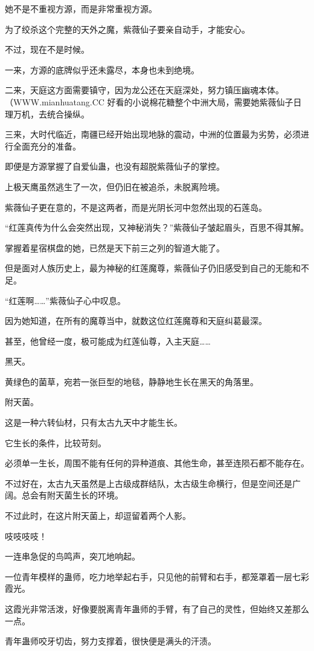 \begin{this_body}
她不是不重视方源，而是非常重视方源。

为了绞杀这个完整的天外之魔，紫薇仙子要亲自动手，才能安心。

不过，现在不是时候。

一来，方源的底牌似乎还未露尽，本身也未到绝境。

二来，天庭这方面需要镇守，因为龙公还在天庭深处，努力镇压幽魂本体。（WWW.mianhuatang.CC 好看的小说棉花糖整个中洲大局，需要她紫薇仙子日理万机，去统合操纵。

三来，大时代临近，南疆已经开始出现地脉的震动，中洲的位置最为劣势，必须进行全面充分的准备。

即便是方源掌握了自爱仙蛊，也没有超脱紫薇仙子的掌控。

上极天鹰虽然逃生了一次，但仍旧在被追杀，未脱离险境。

紫薇仙子更在意的，不是这两者，而是光阴长河中忽然出现的石莲岛。

“红莲真传为什么会突然出现，又神秘消失？”紫薇仙子皱起眉头，百思不得其解。

掌握着星宿棋盘的她，已然是天下前三之列的智道大能了。

但是面对人族历史上，最为神秘的红莲魔尊，紫薇仙子仍旧感受到自己的无能和不足。

“红莲啊……”紫薇仙子心中叹息。

因为她知道，在所有的魔尊当中，就数这位红莲魔尊和天庭纠葛最深。

甚至，他曾经一度，极可能成为红莲仙尊，入主天庭……

黑天。

黄绿色的菌草，宛若一张巨型的地毯，静静地生长在黑天的角落里。

附天菌。

这是一种六转仙材，只有太古九天中才能生长。

它生长的条件，比较苛刻。

必须单一生长，周围不能有任何的异种道痕、其他生命，甚至连陨石都不能存在。

不过好在，太古九天虽然是上古级成群结队，太古级生命横行，但是空间还是广阔。总会有附天菌生长的环境。

不过此时，在这片附天菌上，却逗留着两个人影。

吱吱吱吱！

一连串急促的鸟鸣声，突兀地响起。

一位青年模样的蛊师，吃力地举起右手，只见他的前臂和右手，都笼罩着一层七彩霞光。

这霞光非常活泼，好像要脱离青年蛊师的手臂，有了自己的灵性，但始终又差那么一点。

青年蛊师咬牙切齿，努力支撑着，很快便是满头的汗渍。


\end{this_body}
